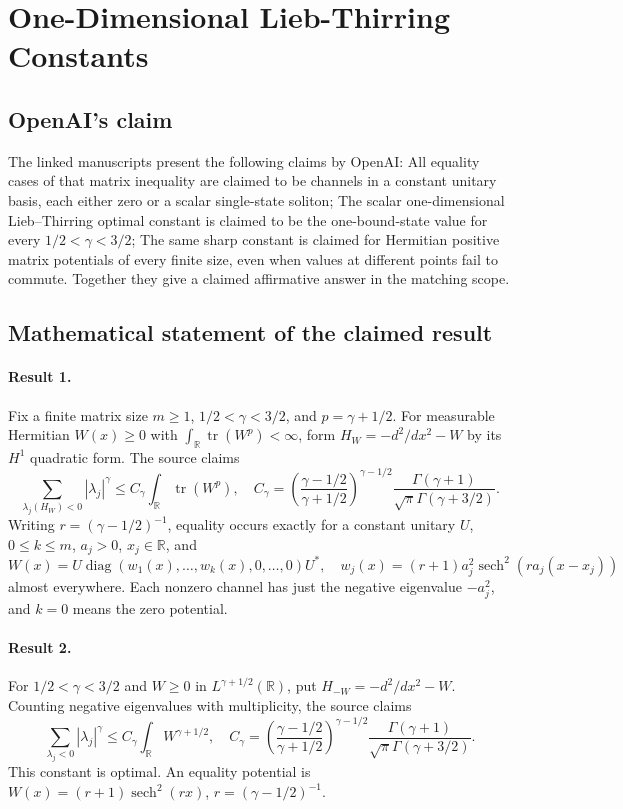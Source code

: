 \documentclass[11pt]{article}
\begin{document}
\section*{One-Dimensional Lieb-Thirring Constants}

\subsection{OpenAI's claim}
The linked manuscripts present the following claims by OpenAI: All equality cases of that matrix inequality are claimed to be channels in a constant unitary basis, each either zero or a scalar single-state soliton; The scalar one-dimensional Lieb--Thirring optimal constant is claimed to be the one-bound-state value for every $1/2<\gamma<3/2$; The same sharp constant is claimed for Hermitian positive matrix potentials of every finite size, even when values at different points fail to commute. Together they give a claimed affirmative answer in the matching scope.

\subsection{Mathematical statement of the claimed result}
\paragraph{Result 1.} Fix a finite matrix size \(m\ge1\), \(1/2<\gamma<3/2\), and \(p=\gamma+1/2\). For measurable Hermitian \(W(x)\ge0\) with \(\int_{\mathbb R}\operatorname{tr}(W^p)<\infty\), form \(H_W=-d^2/dx^2-W\) by its \(H^1\) quadratic form. The source claims
\[
 \sum_{\lambda_j(H_W)<0}|\lambda_j|^\gamma
 \le C_\gamma\int_{\mathbb R}\operatorname{tr}(W^p),\quad
 C_\gamma=\left(\frac{\gamma-1/2}{\gamma+1/2}\right)^{\gamma-1/2}
 \frac{\Gamma(\gamma+1)}{\sqrt\pi\Gamma(\gamma+3/2)}.
\]
Writing \(r=(\gamma-1/2)^{-1}\), equality occurs exactly for a constant unitary \(U\), \(0\le k\le m\), \(a_j>0\), \(x_j\in\mathbb R\), and
\[
 W(x)=U\operatorname{diag}(w_1(x),\ldots,w_k(x),0,\ldots,0)U^*,\quad
 w_j(x)=(r+1)a_j^2\operatorname{sech}^2(ra_j(x-x_j))
\]
almost everywhere. Each nonzero channel has just the negative eigenvalue \(-a_j^2\), and \(k=0\) means the zero potential.

\paragraph{Result 2.} For \(1/2<\gamma<3/2\) and \(W\ge0\) in \(L^{\gamma+1/2}(\mathbb R)\), put \(H_{-W}=-d^2/dx^2-W\). Counting negative eigenvalues with multiplicity, the source claims
\[
 \sum_{\lambda_j<0}|\lambda_j|^\gamma\le C_\gamma\int_{\mathbb R}W^{\gamma+1/2},\quad
 C_\gamma=\left(\frac{\gamma-1/2}{\gamma+1/2}\right)^{\gamma-1/2}
 \frac{\Gamma(\gamma+1)}{\sqrt\pi\Gamma(\gamma+3/2)}.
\]
This constant is optimal. An equality potential is \(W(x)=(r+1)\operatorname{sech}^2(rx)\), \(r=(\gamma-1/2)^{-1}\).
\end{document}
